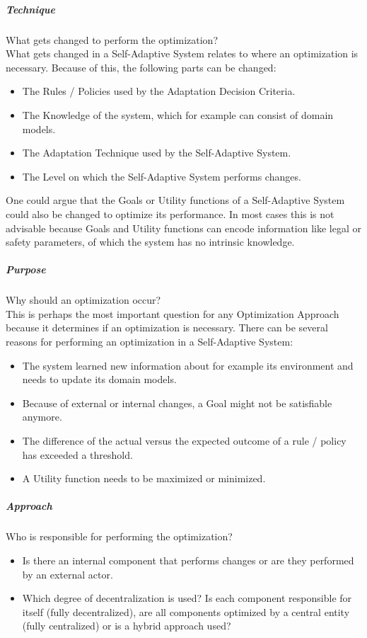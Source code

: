 \subparagraph*{Technique}
What gets changed to perform the optimization? \\
What gets changed in a Self-Adaptive System relates to where an optimization is necessary.
Because of this, the following parts can be changed:
\begin{itemize}
    \item The Rules / Policies used by the Adaptation Decision Criteria.
    \item The Knowledge of the system, which for example can consist of domain models.
    \item The Adaptation Technique used by the Self-Adaptive System.
    \item The Level on which the Self-Adaptive System performs changes.
\end{itemize}
One could argue that the Goals or Utility functions of a Self-Adaptive System could also be changed to optimize its performance.
In most cases this is not advisable because Goals and Utility functions can encode information
like legal or safety parameters, of which the system has no intrinsic knowledge.

\subparagraph*{Purpose}
Why should an optimization occur? \\
This is perhaps the most important question for any Optimization Approach because it determines if an optimization is necessary.
There can be several reasons for performing an optimization in a Self-Adaptive System:
\begin{itemize}
    \item The system learned new information about for example its environment and needs to update its domain models.
    \item Because of external or internal changes, a Goal might not be satisfiable anymore.
    \item The difference of the actual versus the expected outcome of a rule / policy has exceeded a threshold.
    \item A Utility function needs to be maximized or minimized.
\end{itemize}

\subparagraph*{Approach}
Who is responsible for performing the optimization? \\
\begin{itemize}
    \item Is there an internal component that performs changes or are they performed by an external actor.
    \item Which degree of decentralization is used?
    Is each component responsible for itself (fully decentralized), are all components optimized by a central entity (fully centralized)
    or is a hybrid approach used?
\end{itemize}

